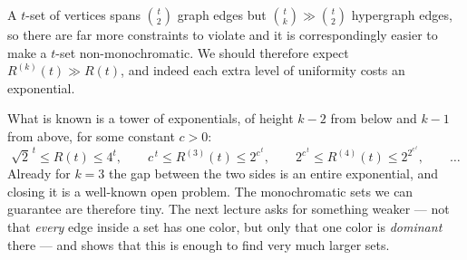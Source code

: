 \begin{remark}
    A \(t\)-set of vertices spans \(\binom{t}{2}\) graph edges but \(\binom{t}{k} \gg \binom{t}{2}\) hypergraph edges, so there are far more constraints to violate and it is correspondingly easier to make a \(t\)-set non-monochromatic. We should therefore expect \(R^{(k)}(t) \gg R(t)\), and indeed each extra level of uniformity costs an exponential.
\end{remark}

What is known is a tower of exponentials, of height \(k-2\) from below and \(k-1\) from above, for some constant \(c > 0\):
\[
    \sqrt{2}^{\,t} \le R(t) \le 4^t, \qquad
    c^{\,t} \le R^{(3)}(t) \le 2^{c^{\,t}}, \qquad
    2^{c^{\,t}} \le R^{(4)}(t) \le 2^{2^{c^{\,t}}}, \qquad \ldots
\]
Already for \(k = 3\) the gap between the two sides is an entire exponential, and closing it is a well-known open problem. The monochromatic sets we can guarantee are therefore tiny. The next lecture asks for something weaker --- not that \emph{every} edge inside a set has one color, but only that one color is \emph{dominant} there --- and shows that this is enough to find very much larger sets.
